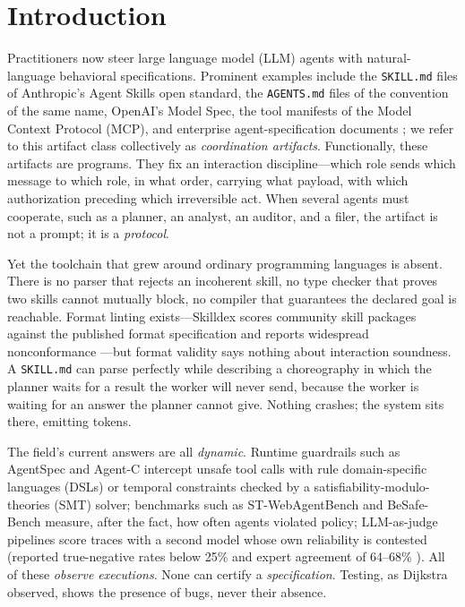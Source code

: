 \documentclass{article}
\begin{document}
\section{Introduction}\label{sec:intro}
Practitioners now steer large language model (LLM) agents with natural-language behavioral specifications. Prominent examples include the \texttt{SKILL.md} files of Anthropic's Agent Skills open standard, the \texttt{AGENTS.md} files of the convention of the same name, OpenAI's Model Spec, the tool manifests of the Model Context Protocol (MCP), and enterprise agent-specification documents \citep{anthropic-skills}; we refer to this artifact class collectively as \emph{coordination artifacts}. Functionally, these artifacts are programs. They fix an interaction discipline---which role sends which message to which role, in what order, carrying what payload, with which authorization preceding which irreversible act. When several agents must cooperate, such as a planner, an analyst, an auditor, and a filer, the artifact is not a prompt; it is a \emph{protocol}.

Yet the toolchain that grew around ordinary programming languages is absent. There is no parser that rejects an incoherent skill, no type checker that proves two skills cannot mutually block, no compiler that guarantees the declared goal is reachable. Format linting exists---Skilldex scores community skill packages against the published format specification and reports widespread nonconformance \citep{skilldex}---but format validity says nothing about interaction soundness. A \texttt{SKILL.md} can parse perfectly while describing a choreography in which the planner waits for a result the worker will never send, because the worker is waiting for an answer the planner cannot give. Nothing crashes; the system sits there, emitting tokens.

The field's current answers are all \emph{dynamic}. Runtime guardrails such as AgentSpec \citep{agentspec} and Agent-C \citep{agentc} intercept unsafe tool calls with rule domain-specific languages (DSLs) or temporal constraints checked by a satisfiability-modulo-theories (SMT) solver; benchmarks such as ST-WebAgentBench \citep{stweb} and BeSafe-Bench \citep{besafe} measure, after the fact, how often agents violated policy; LLM-as-judge pipelines score traces with a second model whose own reliability is contested (reported true-negative rates below 25\% and expert agreement of 64--68\% \citep{judgebias}). All of these \emph{observe executions}. None can certify a \emph{specification}. Testing, as Dijkstra observed, shows the presence of bugs, never their absence.
\end{document}
